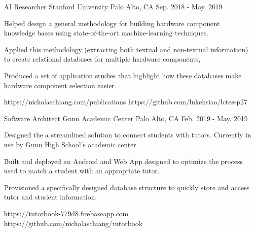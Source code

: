 

\begin{cventries}

  \cvartifact
    {AI Researcher} %
    {Stanford University} %
    {Palo Alto, CA} %
    {Sep. 2018 - May. 2019} %
    {
      \begin{cvitems} %
        \item {Helped design a general methodology for building hardware component knowledge
		bases using state-of-the-art machine-learning techniques.}
	\item {Applied this methodology (extracting both textual and non-textual
		information) to create relational databases
		for multiple hardware components, }
	\item {Produced a set of application studies that highlight how
		these databases make hardware component selection easier.}
      \end{cvitems}
    }
    {https://nicholaschiang.com/publications} %
    {https://github.com/lukehsiao/lctes-p27} %

  \cvartifact
    {Software Architect} %
    {Gunn Academic Center} %
    {Palo Alto, CA} %
    {Feb. 2019 - May. 2019} %
    {
      \begin{cvitems} %
        \item {Designed the a streamlined solution to connect students with
		tutors. Currently in use by Gunn High School's
		academic center.}
        \item {Built and deployed an Android and Web App designed to optimize
		the process used to match a student with an appropriate
		tutor.}
        \item {Provisioned a specifically designed database structure to
		quickly store and access tutor and student information.}
      \end{cvitems}
    }
    {https://tutorbook-779d8.firebaseapp.com} %
    {https://github.com/nicholaschiang/tutorbook} %

\end{cventries}
